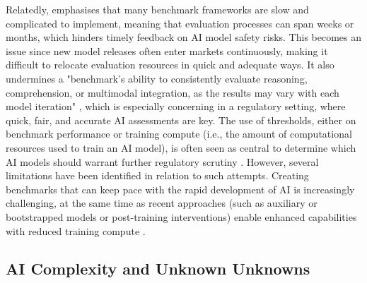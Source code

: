 Relatedly, \citet{mcintosh2024} emphasises that many benchmark frameworks are slow and complicated to implement, meaning that evaluation processes can span weeks or months, which hinders timely feedback on AI model safety risks. This becomes an issue since new model releases often enter markets continuously, making it difficult to relocate evaluation resources in quick and adequate ways. It also undermines a "benchmark's ability to consistently evaluate reasoning, comprehension, or multimodal integration, as the results may vary with each model iteration" \cite[p.~13]{mcintosh2024}, which is especially concerning in a regulatory setting, where quick, fair, and accurate AI assessments are key. 
The use of thresholds, either on benchmark performance or training compute (i.e., the amount of computational resources used to train an AI model), is often seen as central to determine which AI models should warrant further regulatory scrutiny \cite{AIA24, USAIEO2023, USAIDiff2025}. However, several limitations have been identified in relation to such attempts. Creating benchmarks that can keep pace with the rapid development of AI is increasingly challenging, at the same time as recent approaches (such as auxiliary or bootstrapped models or post-training interventions) enable enhanced capabilities with reduced training compute \cite{hooker2024}.

\subsection{AI Complexity and Unknown Unknowns}

